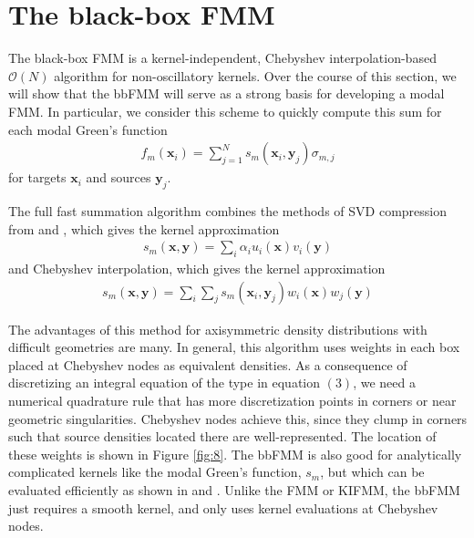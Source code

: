 \documentclass[11pt, oneside]{article}   	%
\begin{document}
\section{The black-box FMM}
The black-box FMM is a kernel-independent, Chebyshev interpolation-based $\mathcal{O}(N)$ algorithm for non-oscillatory kernels. Over the course of this section, we will show that the bbFMM will serve as a strong basis for developing a modal FMM. In particular, we consider this scheme to quickly compute this sum for each modal Green's function
\begin{align}
f_m(\mathbf{x}_i)=\sum_{j=1}^N s_m(\mathbf{x}_i,\mathbf{y}_j)\sigma_{m,j}
\end{align}
for targets $\mathbf{x}_i$ and sources $\mathbf{y}_j$.

The full fast summation algorithm combines the methods of SVD compression from \cite{ZGR} and \cite{MR}, which gives the kernel approximation
\begin{align}
s_m(\mathbf{x},\mathbf{y})=\sum_i \alpha_i u_i(\mathbf{x})v_i(\mathbf{y})
\end{align}
and Chebyshev interpolation, which gives the kernel approximation
\begin{align}
s_m(\mathbf{x},\mathbf{y})=\sum_i\sum_j s_m(\mathbf{x}_i,\mathbf{y}_j)w_i(\mathbf{x})w_j(\mathbf{y})
\end{align}

The advantages of this method for axisymmetric density distributions with difficult geometries are many. In general, this algorithm uses weights in each box placed at Chebyshev nodes as equivalent densities. As a consequence of discretizing an integral equation of the type in equation $(3)$, we need a numerical quadrature rule that has more discretization points in corners or near geometric singularities. Chebyshev nodes achieve this, since they clump in corners such that source densities located there are well-represented. The location of these weights is shown in Figure \ref{fig:8}. The bbFMM is also good for analytically complicated kernels like the modal Green's function, $s_m$, but which can be evaluated efficiently as shown in \cite{HK} and \cite{YYM}. Unlike the FMM or KIFMM, the bbFMM just requires a smooth kernel, and only uses kernel evaluations at Chebyshev nodes.
\end{document}
